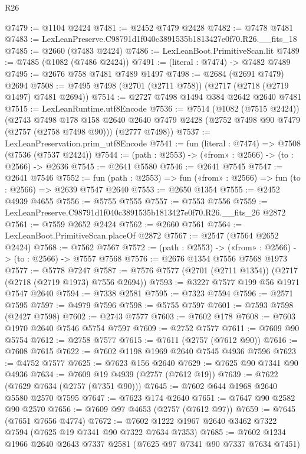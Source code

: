 \begin{lexlean}{R26}
\begin{coremodule}
@7479 := @1104 @2424
@7481 := @2452 @7479 @2428
@7482 := @7478 @7481
@7483 := LexLeanPreserve.C98791d1f040c3891535b1813427e0f70.R26.__fits_18
@7485 := @2660 (@7483 @2424)
@7486 := LexLeanBoot.PrimitiveScan.lit
@7489 := @7485 (@1082 (@7486 @2424))
@7491 := (literal : @7474) -> @7482 @7489
@7495 := @2676 @758 @7481 @7489 @1497
@7498 := @2684 (@2691 @7479) @2694
@7508 := @7495 @7498 (@2701 (@2711 @758)) (@2717 (@2718 (@2719 @1497) @7481 @2694))
@7514 := @2727 @7498 @1494 @384 @2642 @2640 @7481
@7515 := LexLeanRuntime.utf8Encode
@7536 := @7514
    (@1082 (@7515 @2424))
    (@2743
      @7498
      @178
      @158
      @2640
      @2640
      @7479
      @2428
      (@2752 @7498 @90 @7479 (@2757 (@2758 @7498 @90)))
      (@2777 @7498))
@7537 := LexLeanPreservation.prim_utf8Encode
@7541 := fun (literal : @7474) => @7508 (@7536 (@7537 @2424))
@7544 := (path : @2553) -> («from» : @2566) -> (to : @2566) -> @2636
@7545 := @2641 @5580
@7546 := @2641 @7545
@7547 := @2641 @7546
@7552 := fun (path : @2553) => fun («from» : @2566) => fun (to : @2566) => @2639 @7547 @2640
@7553 := @2650 @1354
@7555 := @2452 @4939 @4655
@7556 := @5755 @7555
@7557 := @7553 @7556
@7559 := LexLeanPreserve.C98791d1f040c3891535b1813427e0f70.R26.__fits_26 @2872
@7561 := @7559 @2652 @2424
@7562 := @2660 @7561
@7564 := LexLeanBoot.PrimitiveScan.placeOf @2872
@7567 := @2547 (@7564 @2652 @2424)
@7568 := @7562 @7567
@7572 := (path : @2553) -> («from» : @2566) -> (to : @2566) -> @7557 @7568
@7576 := @2676 @1354 @7556 @7568 @1973
@7577 := @5778 @7247
@7587 := @7576 @7577 (@2701 (@2711 @1354)) (@2717 (@2718 (@2719 @1973) @7556 @2694))
@7593 := @3227 @7577 @199 @56 @1971 @7547 @2640
@7594 := @7338 @2581
@7595 := @7323 @7594
@7596 := @2571 @7595
@7597 := @4979 @7596
@7598 := @5755 @7597
@7601 := @7593 @7598 (@2427 @7598)
@7602 := @2743 @7577
@7603 := @7602 @178
@7608 := @7603 @1970 @2640 @7546 @5754 @7597
@7609 := @2752 @7577
@7611 := @7609 @90 @5754
@7612 := @2758 @7577
@7615 := @7611 (@2757 (@7612 @90))
@7616 := @7608 @7615
@7622 := @7602 @1198 @1969 @2640 @7545 @4936 @7596
@7623 := @4752 @7577
@7625 := @7623 @156 @2640
@7629 := @7625 @90 @7341 @90 @4936
@7634 := @7609 @19 @4939 (@2757 (@7612 @19))
@7639 := @7622 (@7629 @7634 (@2757 (@7351 @90)))
@7645 := @7602 @644 @1968 @2640 @5580 @2570 @7595
@7647 := @7623 @174 @2640
@7651 := @7647 @90 @2582 @90 @2570
@7656 := @7609 @97 @4653 (@2757 (@7612 @97))
@7659 := @7645 (@7651 @7656 @4774)
@7672 := @7602 @1222 @1967 @2640 @3462 @7322 @7594 (@7625 @19 @7341 @90 @7322 @7634 @7353)
@7685 := @7602 @1234 @1966 @2640 @2643 @7337 @2581 (@7625 @97 @7341 @90 @7337 @7634 @7451)

\end{coremodule}
\end{lexlean}
